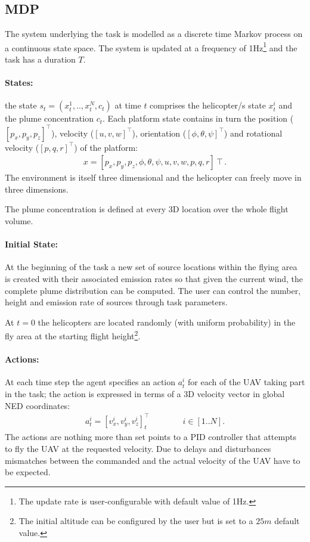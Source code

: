 \documentclass[a4paper,11pt]{report}
\begin{document}
\subsection{MDP}
The system underlying the task is modelled as a discrete time Markov process on a continuous state space. The system is updated at a frequency of 1Hz\footnote{The update rate is user-configurable with default value of 1Hz.} and the task has a duration $T$.

\paragraph{States:} the state $s_t=(x^1_t,..,x^N_t,c_t)$ at time $t$ comprises the helicopter/s state $x^i_t$ and the plume concentration $c_t$.
Each platform state contains in turn the position ($[p_x,p_y,p_z]^\intercal$), velocity ($[u,v,w]^\intercal$), orientation ($[\phi,\theta,\psi]^\intercal$) and rotational velocity ($[p,q,r]^\intercal$) of the platform:
\begin{align}
x = [p_x,p_y,p_z,\phi,\theta,\psi,u,v,w,p,q,r]\intercal .
\end{align} 
The environment is itself three dimensional and the helicopter can freely move in three dimensions. 

The plume concentration is defined at every 3D location over the whole flight volume.

\paragraph{Initial State:} At the beginning of the task a new set of source locations within the flying area is created with their associated emission rates so that given the current wind, the complete plume distribution can be computed. The user can control the number, height and emission rate of sources through task parameters.

At $t=0$ the helicopters are located randomly (with uniform probability) in the fly area at the starting flight height\footnote{The initial altitude can be configured by the user but is set to a $25m$ default value.}.

\paragraph{Actions:}
At each time step the agent specifies an action $a^i_t$ for each of the UAV taking part in the task; the action is expressed in terms of a 3D velocity vector in global NED coordinates:
\begin{align}
a^i_t=[v^i_x,v^i_y,v^i_z]_t^\intercal \qquad\qquad i\in[1..N].
\end{align}
The actions are nothing more than set points to a PID controller that attempts to fly the UAV at the requested velocity.
Due to delays and disturbances mismatches between the commanded and the actual velocity of the UAV have to be expected. 
\end{document}
